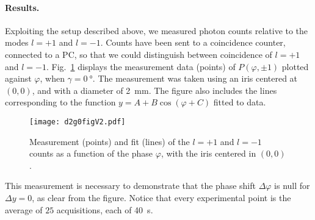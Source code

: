 \documentclass[
reprint,
amsmath,amssymb,
aps,
showkeys
]{revtex4-2}
\begin{document}
\paragraph*{Results.}
Exploiting the setup described above, we measured photon counts relative to the modes $l=+1$ and $l=-1$.
Counts have been sent to a coincidence counter, connected to a PC, so that we could distinguish between coincidence of $l=+1$ and $l=-1$.
Fig.~\ref{fig:results1} displays the measurement data (points) of $P\left(\varphi, \pm 1\right)$ plotted against $\varphi$, when $\gamma = \SI{0}{\degree}$.
The measurement was taken using an iris centered at $\left(0,0\right)$, and with a diameter of \SI{2}{\milli\meter}.
The figure also includes the lines corresponding to the function $y = A + B\cos\left(\varphi + C\right)$ fitted to data.
%
\begin{figure}
\texttt{[image: d2g0figV2.pdf]}
\caption{Measurement (points) and fit (lines) of the $l=+1$ and $l=-1$ counts as a function of the phase $\varphi$, with the iris centered in $\left(0,0\right)$.}
\label{fig:results1}
\end{figure}
%
This measurement is necessary to demonstrate that the phase shift $\Delta\varphi$ is null for $\Delta y = 0$, as clear from the figure.
Notice that every experimental point is the average of $25$ acquisitions, each of \SI{40}{\second}.
\end{document}
